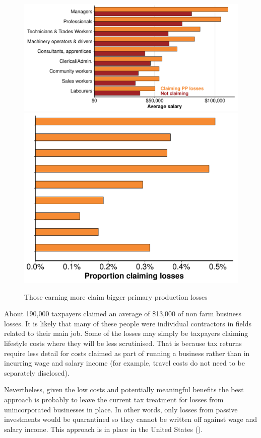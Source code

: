 \documentclass{grattanAlpha}\usepackage[]{graphicx}\usepackage[]{color}
\begin{document}
\begin{figure}
\caption{Those earning more claim bigger primary production losses\label{fig:PP-losses-by-salary}}
{
	\includegraphics[width=1.27273\columnwidth]{CGT-NG-atlas/PP-losers-salary-comparison-horiz-bar-1.pdf}
}
{
	\includegraphics[width=0.8\columnwidth]{CGT-NG-atlas/Proportions-PP-losses-1.pdf}
}
\end{figure}
About 190,000 taxpayers claimed an average of \$13,000 of non farm business losses. It is likely that many of these people were individual contractors in fields related to their main job. Some of the losses may simply be taxpayers claiming lifestyle costs where they will be less scrutinised. 
That is because tax returns require less detail for costs claimed as part of running a business rather than in incurring wage and salary income (for example, travel costs do not need to be separately disclosed). 

Nevertheless, given the low costs and potentially meaningful benefits the best approach is probably to leave the current tax treatment for losses from unincorporated businesses in place. 
In other words, only losses from passive investments would be quarantined so they cannot be written off against wage and salary income. 
This approach is in place in the United States (). 
\end{document}
